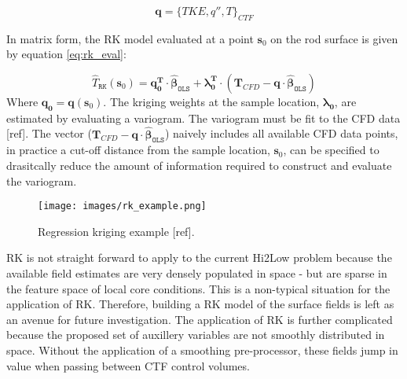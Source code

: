 \begin{equation}
\mathbf{q} = \{TKE, q'', T\}_{CTF}
\end{equation}

In matrix form, the RK model evaluated at a point $\mathbf{s}_0 $ on the rod surface is given by equation \ref{eq:rk_eval}:

\begin{equation}
\hat T_\mathtt{RK}(\mathbf{s}_0 ) = \mathbf{q}_\mathbf{0}^\mathbf{T} \cdot \mathbf{\hat \beta}_\mathtt{OLS} + \mathbf{\lambda }_\mathbf{0}^\mathbf{T} \cdot (\mathbf T_{CFD}
- \mathbf{q} \cdot \mathbf{\hat \beta }_\mathtt{OLS} )
\label{eq:rk_eval}
\end{equation}
Where $\mathbf{q}_\mathbf{0}= \mathbf{q}(\mathbf s_0)$. The kriging weights at the sample location, $\mathbf{\lambda_0}$, are estimated by evaluating a variogram. The variogram must be fit to the CFD data [ref].  The vector ($\mathbf T_{CFD}
- \mathbf{q} \cdot \mathbf{\hat \beta }_\mathtt{OLS}$) naively includes all available CFD data points, in practice a cut-off distance from the sample location, $\mathbf s_0$, can be specified to drasitcally reduce the amount of information required to construct and evaluate the variogram.

\begin{figure}[hbtp]
\centering
\texttt{[image: images/rk\_example.png]}
\caption{Regression kriging example [ref].}
\label{fit:rk}
\end{figure}

RK is not straight forward to apply to the current Hi2Low problem because the available field estimates are very densely populated in space - but are sparse in the feature space of local core conditions. This is a non-typical situation for the application of RK. Therefore, building a RK model of the surface fields is left as an avenue for future investigation.
The application of RK is further complicated because the proposed set of auxillery variables are not smoothly distributed in space.  Without the application of a smoothing pre-processor, these
fields jump in value when passing between CTF control volumes.

